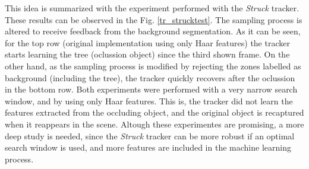 This idea is summarized with the experiment performed with the {\it Struck} tracker. These results can be observed in the Fig. \ref{tr_strucktest}. The sampling process is altered to receive feedback 
from the background segmentation. As it can be seen, for the top row (original implementation using only Haar features) the tracker starts 
learning the tree (oclussion object) since the third shown frame. On the other hand, as the sampling process is modified by rejecting the zones 
labelled as background (including the tree), the tracker quickly recovers after the oclussion in the bottom row. Both experiments were performed 
with a very narrow search window, and by using only Haar features. This is, the tracker did not learn the features extracted 
from the occluding object, and the original object is recaptured when it reappears in the scene. Altough these experimentes are promising, a more deep study is needed, since the {\it Struck} tracker can be more robust if an optimal search window is used, and more features are included in 
the machine learning process.

